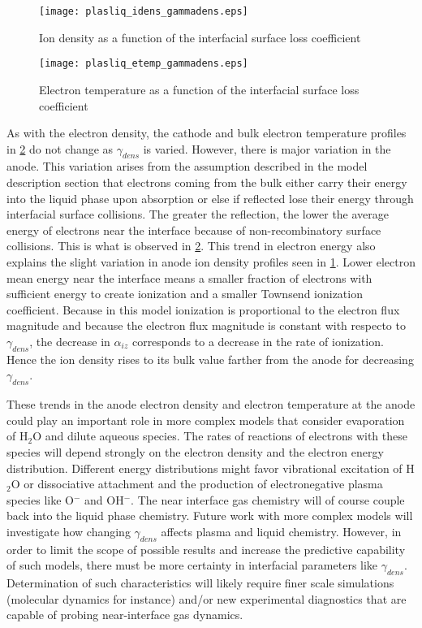 \begin{figure}[htpb]
  \centering
  \texttt{[image: plasliq\_idens\_gammadens.eps]}
  \caption{Ion density as a function of the interfacial surface loss coefficient}
  \label{fig:ions}
\end{figure}

\begin{figure}[htpb]
  \centering
  \texttt{[image: plasliq\_etemp\_gammadens.eps]}
  \caption{Electron temperature as a function of the interfacial surface loss coefficient}
  \label{fig:e_temp}
\end{figure}

As with the electron density, the cathode and bulk electron temperature profiles in \cref{fig:e_temp} do not change as $\gamma_{dens}$ is varied. However, there is major variation in the anode. This variation arises from the assumption described in the model description section that electrons coming from the bulk either carry their energy into the liquid phase upon absorption or else if reflected lose their energy through interfacial surface collisions. The greater the reflection, the lower the average energy of electrons near the interface because of non-recombinatory surface collisions. This is what is observed in \cref{fig:e_temp}. This trend in electron energy also explains the slight variation in anode ion density profiles seen in \cref{fig:ions}. Lower electron mean energy near the interface means a smaller fraction of electrons with sufficient energy to create ionization and a smaller Townsend ionization coefficient. Because in this model ionization is proportional to the electron flux magnitude and because the electron flux magnitude is constant with respecto to $\gamma_{dens}$, the decrease in $\alpha_{iz}$ corresponds to a decrease in the rate of ionization. Hence the ion density rises to its bulk value farther from the anode for decreasing $\gamma_{dens}$.

These trends in the anode electron density and electron temperature at the anode could play an important role in more complex models that consider evaporation of H$_2$O and dilute aqueous species. The rates of reactions of electrons with these species will depend strongly on the electron density and the electron energy distribution. Different energy distributions might favor vibrational excitation of H$_2$O or dissociative attachment and the production of electronegative plasma species like O$^-$ and OH$^-$. The near interface gas chemistry will of course couple back into the liquid phase chemistry. Future work with more complex models will investigate how changing $\gamma_{dens}$ affects plasma and liquid chemistry. However, in order to limit the scope of possible results and increase the predictive capability of such models, there must be more certainty in interfacial parameters like $\gamma_{dens}$. Determination of such characteristics will likely require finer scale simulations (molecular dynamics for instance) and/or new experimental diagnostics that are capable of probing near-interface gas dynamics.

